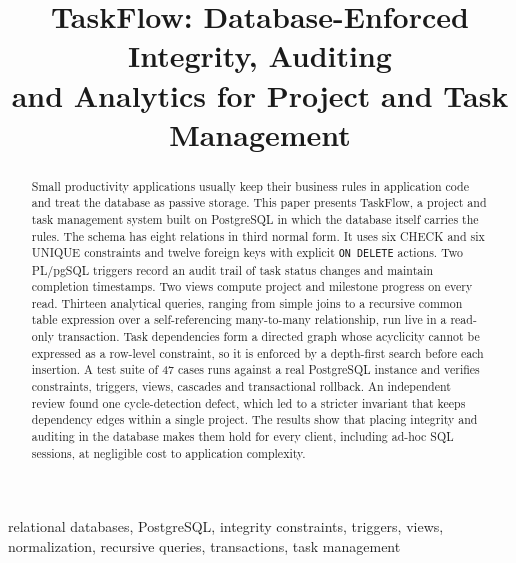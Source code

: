 \documentclass[conference]{IEEEtran}
\begin{document}
\title{TaskFlow: Database-Enforced Integrity, Auditing\\and Analytics for Project and Task Management}

\author{
}

\maketitle

\begin{abstract}
Small productivity applications usually keep their business rules in
application code and treat the database as passive storage. This paper presents
TaskFlow, a project and task management system built on PostgreSQL in which the
database itself carries the rules. The schema has eight relations in third
normal form. It uses six CHECK and six UNIQUE constraints and twelve foreign
keys with explicit \texttt{ON DELETE} actions. Two PL/pgSQL triggers record an
audit trail of task status changes and maintain completion timestamps. Two
views compute project and milestone progress on every read. Thirteen analytical
queries, ranging from simple joins to a recursive common table expression over a
self-referencing many-to-many relationship, run live in a read-only transaction.
Task dependencies form a directed graph whose acyclicity cannot be expressed as a
row-level constraint, so it is enforced by a depth-first search before each
insertion. A test suite of 47 cases runs against a real PostgreSQL instance and
verifies constraints, triggers, views, cascades and transactional rollback. An
independent review found one cycle-detection defect, which led to a stricter
invariant that keeps dependency edges within a single project. The results show
that placing integrity and auditing in the database makes them hold for every
client, including ad-hoc SQL sessions, at negligible cost to application
complexity.
\end{abstract}

\begin{IEEEkeywords}
relational databases, PostgreSQL, integrity constraints, triggers, views,
normalization, recursive queries, transactions, task management
\end{IEEEkeywords}
\end{document}
